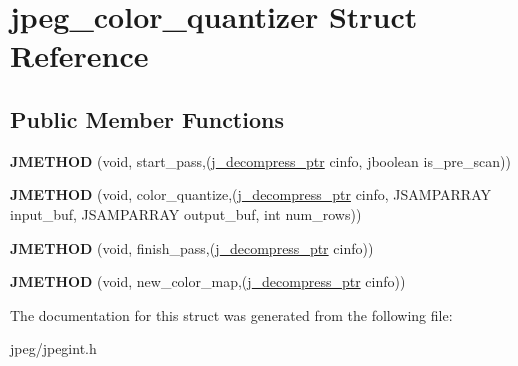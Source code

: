 \hypertarget{structjpeg__color__quantizer}{}\section{jpeg\+\_\+color\+\_\+quantizer Struct Reference}
\label{structjpeg__color__quantizer}
\subsection*{Public Member Functions}
\begin{DoxyCompactItemize}
\item 
{\bfseries J\+M\+E\+T\+H\+OD} (void, start\+\_\+pass,(\hyperlink{structjpeg__decompress__struct}{j\+\_\+decompress\+\_\+ptr} cinfo, jboolean is\+\_\+pre\+\_\+scan))\hypertarget{structjpeg__color__quantizer_a7da356cf4882702af889adf3253430eb}{}\label{structjpeg__color__quantizer_a7da356cf4882702af889adf3253430eb}

\item 
{\bfseries J\+M\+E\+T\+H\+OD} (void, color\+\_\+quantize,(\hyperlink{structjpeg__decompress__struct}{j\+\_\+decompress\+\_\+ptr} cinfo, J\+S\+A\+M\+P\+A\+R\+R\+AY input\+\_\+buf, J\+S\+A\+M\+P\+A\+R\+R\+AY output\+\_\+buf, int num\+\_\+rows))\hypertarget{structjpeg__color__quantizer_ac11184c8e0fdc9c0ec200c0fab197b5f}{}\label{structjpeg__color__quantizer_ac11184c8e0fdc9c0ec200c0fab197b5f}

\item 
{\bfseries J\+M\+E\+T\+H\+OD} (void, finish\+\_\+pass,(\hyperlink{structjpeg__decompress__struct}{j\+\_\+decompress\+\_\+ptr} cinfo))\hypertarget{structjpeg__color__quantizer_abb5268c27447bc9ae1876c5fffa94081}{}\label{structjpeg__color__quantizer_abb5268c27447bc9ae1876c5fffa94081}

\item 
{\bfseries J\+M\+E\+T\+H\+OD} (void, new\+\_\+color\+\_\+map,(\hyperlink{structjpeg__decompress__struct}{j\+\_\+decompress\+\_\+ptr} cinfo))\hypertarget{structjpeg__color__quantizer_a9531395d8c6f914f57bea01ff2b2c5b4}{}\label{structjpeg__color__quantizer_a9531395d8c6f914f57bea01ff2b2c5b4}

\end{DoxyCompactItemize}


The documentation for this struct was generated from the following file\+:\begin{DoxyCompactItemize}
\item 
jpeg/jpegint.\+h\end{DoxyCompactItemize}
